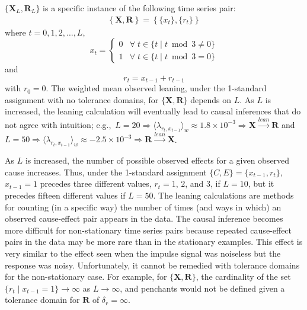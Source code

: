 \documentclass[twocolumn,aps,pre,groupedaddress]{revtex4-1}
\begin{document}
$\{\mathbf{X}_L,\mathbf{R}_L\}$ is a specific instance of the following time series pair:
\begin{eqnarray}
\left\{\mathbf{X},\mathbf{R}\right\} = \left\{\{x_t\},\{r_t\}\right\}
\end{eqnarray}
where $t=0,1,2,\ldots,L$,
\begin{equation}
x_t = \left\{
  \begin{array}{lr}
    0 & \forall\; t\in\{t\;|\;t\bmod 3 \neq 0\}\\
    1 & \forall\; t\in\{t\;|\;t\bmod 3 = 0\}
  \end{array}
\right.
\end{equation}
and
\begin{equation}
r_t = x_{t-1}+r_{t-1}
\end{equation}
with $r_0 = 0$.  The weighted mean observed leaning, under the 1-standard assignment with no tolerance domains, for $\{\mathbf{X},\mathbf{R}\}$ depends on $L$.  As $L$ is increased, the leaning calculation will eventually lead to causal inferences that do not agree with intuition; e.g.,\ $L = 20 \Rightarrow \langle \lambda_{r_t,x_{t-1}} \rangle_w \approx 1.8\times10^{-3} \Rightarrow \mathbf{X}\xrightarrow{lean}\mathbf{R}$ and $L = 50 \Rightarrow \langle \lambda_{r_t,x_{t-1}} \rangle_w \approx -2.5\times10^{-3} \Rightarrow \mathbf{R}\xrightarrow{lean}\mathbf{X}$.  

As $L$ is increased, the number of possible observed effects for a given observed cause increases.  Thus, under the 1-standard assignment $\{C,E\} = \{x_{t-1},r_t\}$, $x_{t-1}=1$ precedes three different values, $r_t = 1$, $2$, and $3$, if $L=10$, but it precedes fifteen different values if $L=50$.  The leaning calculations are methods for counting (in a specific way) the number of times (and ways in which) an observed cause-effect pair appears in the data.  The causal inference becomes more difficult for non-stationary time series pairs because repeated cause-effect pairs in the data may be more rare than in the stationary examples.  This effect is very similar to the effect seen when the impulse signal was noiseless but the response was noisy.  Unfortunately, it cannot be remedied with tolerance domains for the non-stationary case.  For example, for $\{\mathbf{X},\mathbf{R}\}$, the cardinality of the set $\{r_t\;|\;x_{t-1}=1\}\rightarrow\infty$ as $L\rightarrow\infty$, and penchants would not be defined given a tolerance domain for $\mathbf{R}$ of $\delta_r=\infty$.
\end{document}

